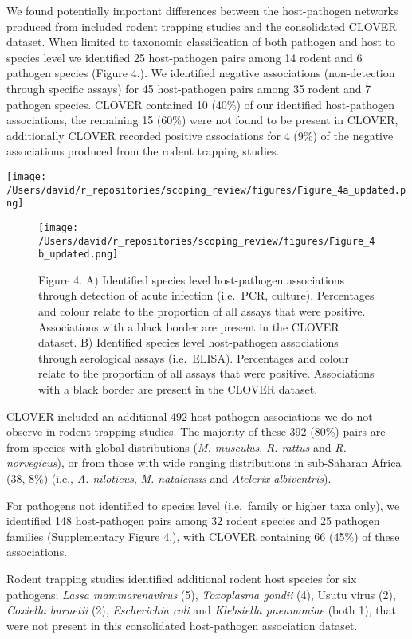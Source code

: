 \documentclass[
]{article}
\begin{document}
We found potentially important differences between the host-pathogen
networks produced from included rodent trapping studies and the
consolidated CLOVER dataset. When limited to taxonomic classification of
both pathogen and host to species level we identified 25 host-pathogen
pairs among 14 rodent and 6 pathogen species (Figure 4.). We identified
negative associations (non-detection through specific assays) for 45
host-pathogen pairs among 35 rodent and 7 pathogen species. CLOVER
contained 10 (40\%) of our identified host-pathogen associations, the
remaining 15 (60\%) were not found to be present in CLOVER, additionally
CLOVER recorded positive associations for 4 (9\%) of the negative
associations produced from the rodent trapping studies.

\texttt{[image: /Users/david/r\_repositories/scoping\_review/figures/Figure\_4a\_updated.png]}

\begin{figure}
\centering
\texttt{[image: /Users/david/r\_repositories/scoping\_review/figures/Figure\_4b\_updated.png]}
\caption{Figure 4. A) Identified species level host-pathogen
associations through detection of acute infection (i.e.~PCR, culture).
Percentages and colour relate to the proportion of all assays that were
positive. Associations with a black border are present in the CLOVER
dataset. B) Identified species level host-pathogen associations through
serological assays (i.e.~ELISA). Percentages and colour relate to the
proportion of all assays that were positive. Associations with a black
border are present in the CLOVER dataset.}
\end{figure}

CLOVER included an additional 492 host-pathogen associations we do not
observe in rodent trapping studies. The majority of these 392 (80\%)
pairs are from species with global distributions (\emph{M. musculus},
\emph{R. rattus} and \emph{R. norvegicus}), or from those with wide
ranging distributions in sub-Saharan Africa (38, 8\%) (i.e., \emph{A.
niloticus}, \emph{M. natalensis} and \emph{Atelerix albiventris}).

For pathogens not identified to species level (i.e.~family or higher
taxa only), we identified 148 host-pathogen pairs among 32 rodent
species and 25 pathogen families (Supplementary Figure 4.), with CLOVER
containing 66 (45\%) of these associations.

Rodent trapping studies identified additional rodent host species for
six pathogens; \emph{Lassa mammarenavirus} (5), \emph{Toxoplasma gondii}
(4), Usutu virus (2), \emph{Coxiella burnetii} (2), \emph{Escherichia
coli} and \emph{Klebsiella pneumoniae} (both 1), that were not present
in this consolidated host-pathogen association dataset.
\end{document}
